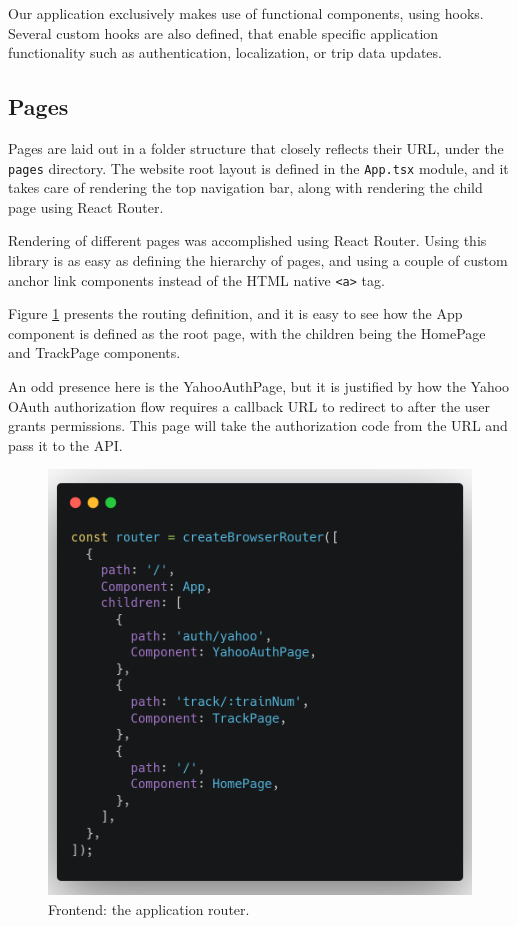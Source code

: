Our application exclusively makes use of functional components, using hooks. Several custom hooks are also defined, that enable specific application functionality such as authentication, localization, or trip data updates.

\subsection{Pages}
Pages are laid out in a folder structure that closely reflects their URL, under the \verb|pages| directory. The website root layout is defined in the \verb|App.tsx| module, and it takes care of rendering the top navigation bar, along with rendering the child page using React Router.

Rendering of different pages was accomplished using React Router. Using this library is as easy as defining the hierarchy of pages, and using a couple of custom anchor link components instead of the HTML native \verb|<a>| tag.

Figure \ref{FigFeRouter} presents the routing definition, and it is easy to see how the App component is defined as the root page, with the children being the HomePage and TrackPage components.

An odd presence here is the YahooAuthPage, but it is justified by how the Yahoo OAuth authorization flow requires a callback URL to redirect to after the user grants permissions. This page will take the authorization code from the URL and pass it to the API.

\begin{figure}[htbp]
    \centering
    \includegraphics[width=.6\textwidth]{./figures/code/fe_router.png}
    \caption{Frontend: the application router.}
    \label{FigFeRouter}
\end{figure}

